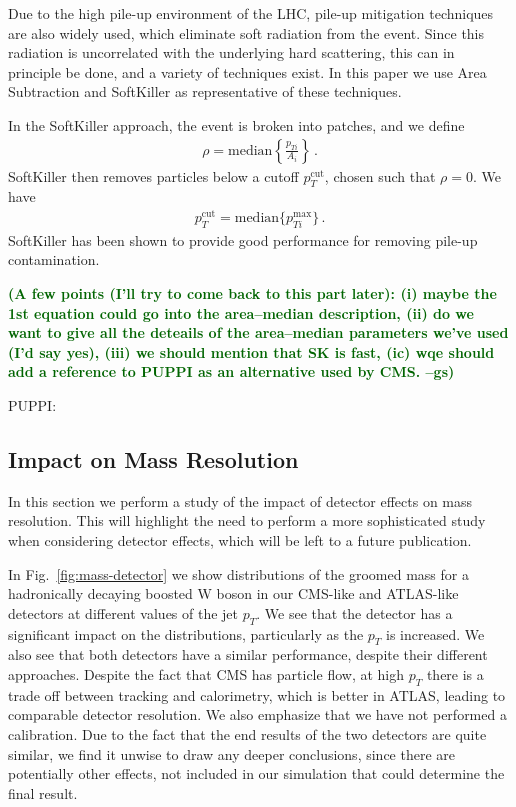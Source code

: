 \documentclass[11pt,letterpaper]{article}
\DeclareRobustCommand{\Fig}[1]{Fig.~\ref{#1}}
\newcommand{\gs}[1]{\textbf{\textcolor{darkgreen}{(#1 --gs)}}}
\begin{document}
Due to the high pile-up environment of the LHC, pile-up mitigation techniques \cite{Cacciari:2007fd,Alon:2011xb,Soyez:2012hv,Tseng:2013dva,Krohn:2013lba,Cacciari:2014gra,Bertolini:2014bba} are also widely used, which eliminate soft radiation from the event.
%
Since this radiation is uncorrelated with the underlying hard scattering, this can in principle be done, and a variety of techniques exist.
%
In this paper we use Area Subtraction \cite{Cacciari:2007fd,Cacciari:2008gn} and SoftKiller \cite{Cacciari:2014gra} as representative of these techniques.

In the SoftKiller approach, the event is broken into patches, and we define
\begin{align}
\rho= \text{median} \left \{ \frac{p_{Ti}}{A_i}   \right \}\,.
\end{align}
SoftKiller then removes particles below a cutoff $p_T^{\text{cut}}$, chosen such that $\rho=0$. We have
\begin{align}
p_T^{\text{cut}}=\text{median} \{ p_{Ti}^{\text{max}} \}\,.
\end{align}
SoftKiller has been shown to provide good performance for removing pile-up contamination.

\gs{A few points (I'll try to come back to
  this part later): (i) maybe the 1st equation could go into the
  area--median description, (ii) do we want to give all the deteails
  of the area--median parameters we've used (I'd say yes), (iii) we
  should mention that SK is fast, (ic) wqe should add a reference to
  PUPPI as an alternative used by CMS.}

PUPPI: \cite{Bertolini:2014bba}

\subsection{Impact on Mass Resolution}\label{sec:detector_robust}

In this section we perform a study of the impact of detector effects on mass resolution. This will highlight the need to perform a more sophisticated study when considering detector effects, which will be left to a future publication.

In \Fig{fig:mass-detector} we show distributions of the groomed mass for a hadronically decaying boosted W boson in our CMS-like and ATLAS-like detectors at different values of the jet $p_T$. We see that the detector has a significant impact on the distributions, particularly as the $p_T$ is increased. We also see that both detectors have a similar performance, despite their different approaches. Despite the fact that CMS has particle flow, at high $p_T$ there is a trade off between tracking and calorimetry, which is better in ATLAS, leading to comparable detector resolution. We also emphasize that we have not performed a calibration. Due to the fact that the end results of the two detectors are quite similar, we find it unwise to draw any deeper conclusions, since there are potentially other effects, not included in our simulation that could determine the final result.
\end{document}
